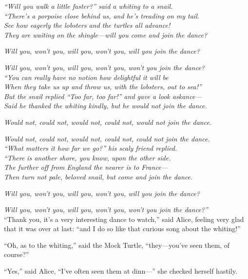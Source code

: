\documentclass[book, 20pt]{extbook}
\begin{document}
\newpage

\noindent\emph{``Will you walk a little faster?'' said a whiting to a snail.\\}
\noindent\emph{``There's a porpoise close behind us, and he's treading on my tail.\\}
\noindent\emph{See how eagerly the lobsters and the turtles all advance!\\}
\noindent\emph{They are waiting on the shingle---will you come and join the dance?}

\emph{Will you, won't you, will you, won't you, will you join the dance?}

\emph{Will you, won't you, will you, won't you, won't you join the dance?\\}
\bigskip
\noindent\emph{``You can really have no notion how delightful it will be\\}
\noindent\emph{When they take us up and throw us, with the lobsters, out to sea!''\\}
\noindent\emph{But the snail replied ``Too far, too far!'' and gave a look askance---\\}
\noindent\emph{Said he thanked the whiting kindly, but he would not join the dance.}

\emph{Would not, could not, would not, could not, would not join the dance.}

\emph{Would not, could not, would not, could not, could not join the dance.\\}
\bigskip
\noindent\emph{``What matters it how far we go?'' his scaly friend replied.\\}
\noindent\emph{``There is another shore, you know, upon the other side.\\}
\noindent\emph{The further off from England the nearer is to France---\\}
\noindent\emph{Then turn not pale, beloved snail, but come and join the dance.}

\emph{Will you, won't you, will you, won't you, will you join the dance?}

\emph{Will you, won't you, will you, won't you, won't you join the dance?''\\}
\bigskip
``Thank you, it's a very interesting dance to watch,'' said Alice,
feeling very glad that it was over at last: ``and I do so like that
curious song about the whiting!''

``Oh, as to the whiting,'' said the Mock Turtle, ``they---you've seen
them, of course?''

``Yes,'' said Alice, ``I've often seen them at dinn---'' she checked
herself hastily.
\end{document}
